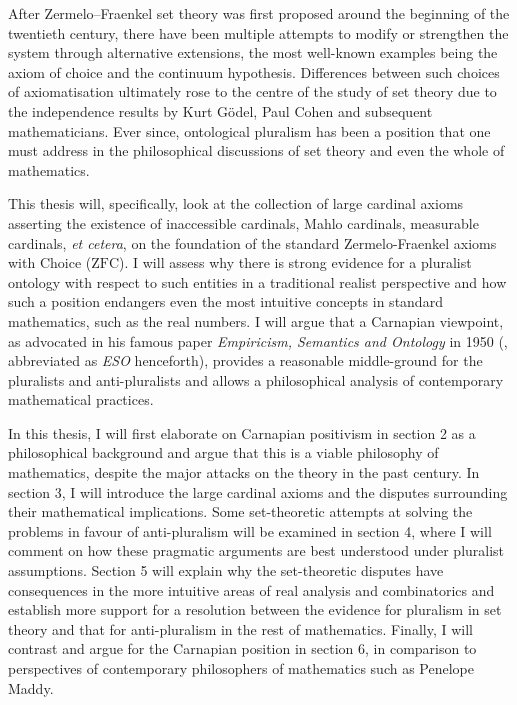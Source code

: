 \documentclass[12pt]{article}
\theoremstyle{plain}
\theoremstyle{definition}
\newcommand{\ZFC}{\mathrm{ZFC}}
\begin{document}
After Zermelo--Fraenkel set theory was first proposed around the beginning of the twentieth century, there have been multiple attempts to modify or strengthen the system through alternative extensions, the most well-known examples being the axiom of choice and the continuum hypothesis. Differences between such choices of axiomatisation ultimately rose to the centre of the study of set theory due to the independence results by Kurt G\"odel, Paul Cohen and subsequent mathematicians. Ever since, ontological pluralism has been a position that one must address in the philosophical discussions of set theory and even the whole of mathematics.

This thesis will, specifically, look at the collection of large cardinal axioms asserting the existence of inaccessible cardinals, Mahlo cardinals, measurable cardinals, \emph{et cetera}, on the foundation of the standard Zermelo-Fraenkel axioms with Choice ($\ZFC$). I will assess why there is strong evidence for a pluralist ontology with respect to such entities in a traditional realist perspective and how such a position endangers even the most intuitive concepts in standard mathematics, such as the real numbers. I will argue that a Carnapian viewpoint, as advocated in his famous paper \emph{Empiricism, Semantics and Ontology} in 1950 (\cite{carnap-eso}, abbreviated as \emph{ESO} henceforth), provides a reasonable middle-ground for the pluralists and anti-pluralists and allows a philosophical analysis of contemporary mathematical practices.

In this thesis, I will first elaborate on Carnapian positivism in section 2 as a philosophical background and argue that this is a viable philosophy of mathematics, despite the major attacks on the theory in the past century. In section 3, I will introduce the large cardinal axioms and the disputes surrounding their mathematical implications. Some set-theoretic attempts at solving the problems in favour of anti-pluralism will be examined in section 4, where I will comment on how these pragmatic arguments are best understood under pluralist assumptions. Section 5 will explain why the set-theoretic disputes have consequences in the more intuitive areas of real analysis and combinatorics and establish more support for a resolution between the evidence for pluralism in set theory and that for anti-pluralism in the rest of mathematics. Finally, I will contrast and argue for the Carnapian position in section 6, in comparison to perspectives of contemporary philosophers of mathematics such as Penelope Maddy.
\end{document}
